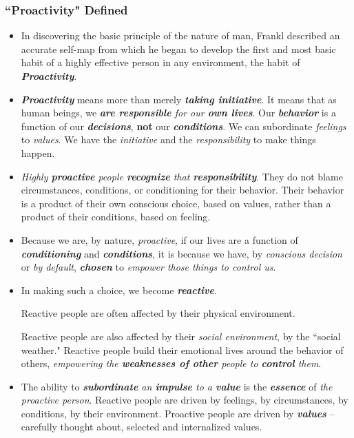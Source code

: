 \documentclass[11pt]{article}
\begin{document}
\subsubsection{``Proactivity" Defined}
\begin{itemize}
\item In discovering the basic principle of the nature of man, Frankl described an accurate self-map from which he began to develop the first and most basic habit of a highly effective person in any environment, the habit of \emph{\textbf{Proactivity}}.

\item \emph{\textbf{Proactivity}} means more than merely \textbf{\emph{taking initiative}}. It means that as human beings, we \emph{\textbf{are responsible} for our \textbf{own lives}}. Our \emph{\textbf{behavior}} is a function of our \emph{\textbf{decisions}}, \textbf{not} our \emph{\textbf{conditions}}. We can subordinate \emph{feelings} to \emph{values}. We have the \emph{initiative} and the \emph{responsibility} to make things happen.

\item \emph{Highly \textbf{proactive} people \textbf{recognize} that \textbf{responsibility}}. They do not blame circumstances, conditions, or conditioning for their behavior. Their behavior is a product of their own conscious choice, based on values, rather than a product of their conditions, based on feeling.

\item Because we are, by nature, \emph{proactive}, if our lives are a function of \emph{\textbf{conditioning}} and \emph{\textbf{conditions}}, it is because we have, by \emph{conscious decision} or \emph{by default}, \emph{\textbf{chosen}} to \emph{empower those things to control us}.

\item In making such a choice, we become \emph{\textbf{reactive}}. 

Reactive people are often affected by their physical environment. 

Reactive people are also affected by their \emph{social environment}, by the ``social weather." Reactive people build their emotional lives around the behavior of others, \emph{empowering the \textbf{weaknesses of other} people to \textbf{control} them}.

\item The ability to \emph{\textbf{subordinate} an \textbf{impulse} to a \textbf{value}} is the \emph{\textbf{essence}} of \emph{the proactive person}. Reactive
people are driven by feelings, by circumstances, by conditions, by their environment. Proactive people are driven by \emph{\textbf{values}} -- carefully thought about, selected and internalized values.


\end{itemize}
\end{document}
